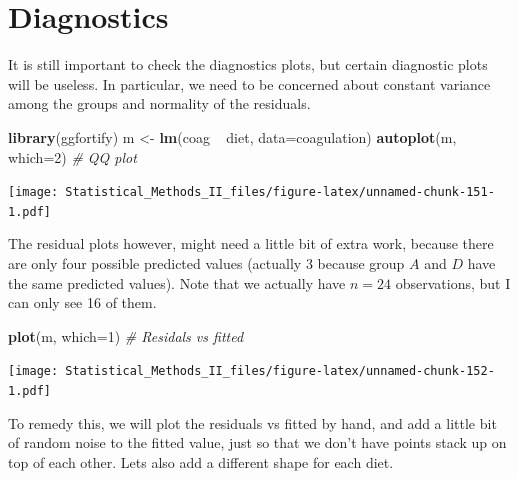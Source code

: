 \documentclass[]{book}
\newenvironment{Shaded}{\begin{snugshade}}{\end{snugshade}}
\newcommand{\KeywordTok}[1]{\textcolor[rgb]{0.13,0.29,0.53}{\textbf{{#1}}}}
\newcommand{\DataTypeTok}[1]{\textcolor[rgb]{0.13,0.29,0.53}{{#1}}}
\newcommand{\DecValTok}[1]{\textcolor[rgb]{0.00,0.00,0.81}{{#1}}}
\newcommand{\FloatTok}[1]{\textcolor[rgb]{0.00,0.00,0.81}{{#1}}}
\newcommand{\StringTok}[1]{\textcolor[rgb]{0.31,0.60,0.02}{{#1}}}
\newcommand{\CommentTok}[1]{\textcolor[rgb]{0.56,0.35,0.01}{\textit{{#1}}}}
\newcommand{\NormalTok}[1]{{#1}}
\theoremstyle{definition}
\theoremstyle{definition}
\theoremstyle{remark}
\begin{document}
\section{Diagnostics}\label{diagnostics}

It is still important to check the diagnostics plots, but certain
diagnostic plots will be useless. In particular, we need to be concerned
about constant variance among the groups and normality of the residuals.

\begin{Shaded}
\begin{Highlighting}[]
\KeywordTok{library}\NormalTok{(ggfortify)}
\NormalTok{m <-}\StringTok{ }\KeywordTok{lm}\NormalTok{(coag ~}\StringTok{ }\NormalTok{diet, }\DataTypeTok{data=}\NormalTok{coagulation)}
\KeywordTok{autoplot}\NormalTok{(m, }\DataTypeTok{which=}\DecValTok{2}\NormalTok{)  }\CommentTok{#  QQ plot}
\end{Highlighting}
\end{Shaded}

\texttt{[image: Statistical\_Methods\_II\_files/figure-latex/unnamed-chunk-151-1.pdf]}

The residual plots however, might need a little bit of extra work,
because there are only four possible predicted values (actually \(3\)
because group \(A\) and \(D\) have the same predicted values). Note that
we actually have \(n=24\) observations, but I can only see 16 of them.

\begin{Shaded}
\begin{Highlighting}[]
\KeywordTok{plot}\NormalTok{(m, }\DataTypeTok{which=}\DecValTok{1}\NormalTok{)  }\CommentTok{#  Residals vs fitted}
\end{Highlighting}
\end{Shaded}

\texttt{[image: Statistical\_Methods\_II\_files/figure-latex/unnamed-chunk-152-1.pdf]}

To remedy this, we will plot the residuals vs fitted by hand, and add a
little bit of random noise to the fitted value, just so that we don't
have points stack up on top of each other. Lets also add a different
shape for each diet.

\begin{Shaded}
\end{Shaded}
\end{document}
